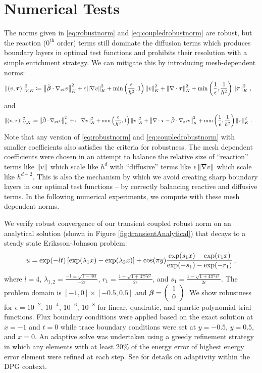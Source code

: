 \documentclass{article}
\theoremstyle{definition}
\theoremstyle{remark}
\begin{document}
\section{Numerical Tests}
The norms given in \eqref{eq:robustnorm} and \eqref{eq:coupledrobustnorm} are robust, 
but the reaction ($0^\text{th}$ order) terms still dominate the diffusion terms which 
produces boundary layers in optimal test functions and
prohibits their resolution with a simple enrichment strategy.
We can mitigate this by introducing mesh-dependent norms:
\begin{align}
\label{eq:meshrobustnorm}
\left\| \left( v,\boldsymbol\tau \right) \right\|_{V,K}^2 &\coloneqq
\left\| \tilde{\boldsymbol\beta}\cdot\nabla_{xt} v \right\|_K^2
+ \epsilon\left\| \nabla v \right\|_K^2
+ \min\left( \frac{\epsilon}{h^2},1 \right)\left\| v \right\|^2_K
+ \left\| \nabla\cdot \boldsymbol\tau \right\|_K^2
+ \min\left( \frac{1}{\epsilon},\frac{1}{h^2} \right)\left\| \boldsymbol\tau \right\|_K^2\,,
\end{align}
and
\begin{align}
\label{eq:meshcoupledrobustnorm}
\left\| \left( v,\boldsymbol\tau \right) \right\|_{V,K}^2 &\coloneqq
\left\| \tilde{\boldsymbol\beta}\cdot\nabla_{xt} v \right\|_K^2
+ \epsilon\left\| \nabla v \right\|_K^2
+ \min\left( \frac{\epsilon}{h^2},1 \right)\left\| v \right\|^2_K
+ \left\| \nabla\cdot \boldsymbol\tau - \tilde{\boldsymbol\beta}\cdot\nabla_{xt} v \right\|_K^2
+ \min\left( \frac{1}{\epsilon},\frac{1}{h^2} \right)\left\| \boldsymbol\tau \right\|_K^2\,.
\end{align}
Note that any version of \eqref{eq:robustnorm} and \eqref{eq:coupledrobustnorm} with smaller coefficients also satisfies the criteria for robustness.
The mesh dependent coefficients were chosen in an attempt to balance the relative size of ``reaction'' terms like $\left\| v \right\|$ which scale like $h^{d}$
with ``diffusive'' terms like $\epsilon\left\| \nabla v \right\|$ which scale like $h^{d-2}$.
This is also the mechanism by which we avoid creating sharp boundary layers in our optimal test functions -- by correctly balancing reactive and diffusive terms.
In the following numerical experiments, we compute with these mesh dependent norms.

We verify robust convergence of our transient coupled robust norm on an analytical solution (shown in Figure \ref{fig:transientAnalytical}) that decays to a steady state Eriksson-Johnson problem:
\[
u=\exp(-lt)\left[ \exp(\lambda_1 x)-\exp(\lambda_2 x) \right]+
\cos(\pi y)\frac{\exp(s_1x)-\exp(r_1x)}{\exp(-s_1)-\exp(-r_1)}\,,
\]
where $l=4$,
$\lambda_{1,2}=\frac{-1\pm\sqrt{1-4\epsilon l}}{-2\epsilon}$,
$r_1=\frac{1+\sqrt{1+4\pi^2\epsilon^2}}{2\epsilon}$, and
$s_1=\frac{1-\sqrt{1+4\pi^2\epsilon^2}}{2\epsilon}$.
The problem domain is $[-1,0]\times[-0.5,0.5]$ and $\boldsymbol\beta=\left( \begin{array}{c} 1\\ 0\\ \end{array} \right)$.
We show robustness for $\epsilon=10^{-2},\,10^{-4},\,10^{-6},\,10^{-8}$ for linear, quadratic, and quartic polynomial trial functions.
Flux boundary conditions were applied based on the exact solution at $x=-1$ and $t=0$ 
while trace boundary conditions were set at $y=-0.5$, $y=0.5$, and $x=0$.
An adaptive solve was undertaken using a greedy refinement strategy in which any elements with at least 20\% of the energy error 
of highest energy error element were refined at each step. See \cite{DPG3} for details on adaptivity within the DPG context.
\end{document}

